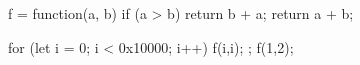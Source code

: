   f = function(a, b) {
    if (a > b) {
        return b + a;
    }
    return a + b;
  }

  for (let i = 0; i < 0x10000; i++) {
    f(i,i);
  };
  f(1,2);